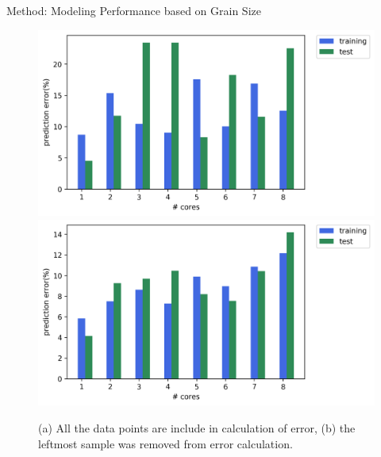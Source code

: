 \documentclass[10pt]{beamer}
\begin{document}
\begin{frame}{Method: Modeling Performance based on Grain Size}
	\begin{outline}
\begin{figure}[H]
	\centering
	{\includegraphics[scale=.35]{images/polyfit/fig_690_total_error.png}\label{fig17:a}}
	{\includegraphics[scale=.35]{images/polyfit/fig_690_total_error_corrected.png}\label{fig17:b}}
	\caption{(a) All the data points are include in calculation of error, (b) the leftmost sample was removed from error calculation.}	
	\label{fig17}
\end{figure}
	\end{outline}
\end{frame}
\end{document}
